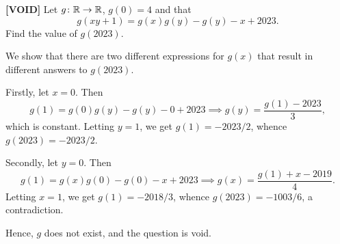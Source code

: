 \begin{question}\label{A::2023-O-1-20}
    \textbf{[VOID]} Let $g \colon \mathbb{R} \to \mathbb{R}$, $g(0) = 4$ and that \[g(xy + 1) = g(x)g(y) - g(y) - x + 2023.\] Find the value of $g(2023)$.
\end{question}
\begin{solution*}
    We show that there are two different expressions for $g(x)$ that result in different answers to $g(2023)$.

    Firstly, let $x = 0$. Then \[g(1) = g(0)g(y) - g(y) - 0 + 2023 \implies g(y) = \frac{g(1) - 2023}{3},\] which is constant. Letting $y = 1$, we get $g(1) = -2023/2$, whence $g(2023) = -2023/2$.

    Secondly, let $y = 0$. Then \[g(1) = g(x)g(0) - g(0) - x + 2023 \implies g(x) = \frac{g(1) + x - 2019}{4}.\] Letting $x = 1$, we get $g(1) = -2018/3$, whence $g(2023) = -1003/6$, a contradiction.

    Hence, $g$ does not exist, and the question is void.
\end{solution*}

